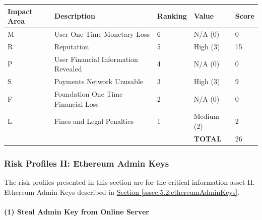 \documentclass[a4paper,12pt]{article} %
\newcommand{\hypersectionref}[1]{\hyperref[#1]{Section \ref{#1}}}
\begin{document}
{\begin{center}
\begin{tabular}{ | l | l | l | l | l |}
  \hline
  \textbf{Impact Area} & \textbf{Description} & \textbf{Ranking} & \textbf{Value} & \textbf{Score}
  \\ \hline
  M & User One Time Monetary Loss			& 6	& N/A (0)		& 0
  \\ \hline
  R & Reputation		& 5	& High (3)		& 15
  \\ \hline
  P & User Financial Information Revealed		& 4	& N/A (0)		& 0
  \\ \hline
  S & Payments Network Unusable					& 3	& High (3)		& 9
  \\ \hline
  F & Foundation One Time Financial Loss	& 2	& N/A (0)		& 0
  \\ \hline
  L & Fines and Legal Penalties						& 1	& Medium (2)	& 2
  \\ \hline
  & & & \textbf{TOTAL} & 26
  \\ \hline
\end{tabular}
\end{center}
\label{tab:severityEthereumScalability}

\subsubsection{Risk Profiles II: Ethereum Admin Keys} \label{sssec:5.3:ethereumAdminKeysRiskProfiles}

The risk profiles presented in this section are for the critical information asset II. Ethereum Admin Keys described in \hypersectionref{sssec:5.2:ethereumAdminKeys}.

\paragraph{(1) Steal Admin Key from Online Server }

}
\end{document}
